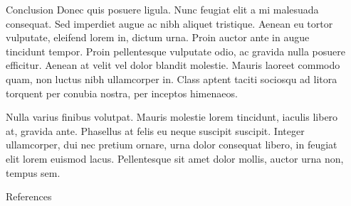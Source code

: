 \documentclass[final,notheorems]{beamer}
\newlength{\sepwidth}
\newlength{\colwidth}
\newcommand{\separatorcolumn}{\begin{column}{\sepwidth}\end{column}}
\begin{document}
\begin{frame}[t]
\begin{columns}[t]
\begin{column}{\colwidth}
\begin{alertblock}{Conclusion}
    Donec quis posuere ligula. Nunc feugiat elit a mi malesuada consequat. Sed
    imperdiet augue ac nibh aliquet tristique. Aenean eu tortor vulputate,
    eleifend lorem in, dictum urna. Proin auctor ante in augue tincidunt
    tempor. Proin pellentesque vulputate odio, ac gravida nulla posuere
    efficitur. Aenean at velit vel dolor blandit molestie. Mauris laoreet
    commodo quam, non luctus nibh ullamcorper in. Class aptent taciti sociosqu
    ad litora torquent per conubia nostra, per inceptos himenaeos.

    Nulla varius finibus volutpat. Mauris molestie lorem tincidunt, iaculis
    libero at, gravida ante. Phasellus at felis eu neque suscipit suscipit.
    Integer ullamcorper, dui nec pretium ornare, urna dolor consequat libero,
    in feugiat elit lorem euismod lacus. Pellentesque sit amet dolor mollis,
    auctor urna non, tempus sem.

  \end{alertblock}

  \begin{block}{References}
    \footnotesize{\printbibliography}
  \end{block}

\end{column}

\separatorcolumn
\end{columns}
\end{frame}
\end{document}
